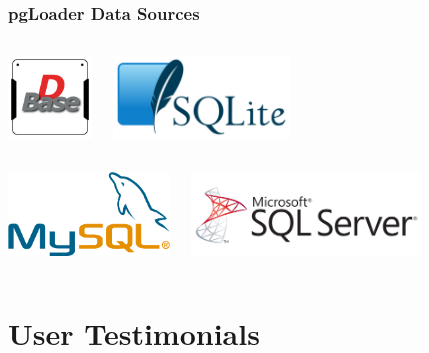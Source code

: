 \documentclass[xcolor=dvipsnames]{beamer}
\begin{document}
\begin{frame}[fragile]
  \frametitle{pgLoader Data Sources}

  \begin{columns}[c]
    \begin{center}
      \includegraphics[height=6em]{dBase.png}
    \end{center}
    \begin{center}
      \includegraphics[height=6em]{SQLite.png}
    \end{center}
  \end{columns}
  
  \begin{columns}[c]
    \begin{center}
      \includegraphics[height=6em]{mysql.png}
    \end{center}
    \begin{center}
      \includegraphics[height=6em]{mssql.png}
    \end{center}
  \end{columns}
\end{frame}

\section{User Testimonials}
\end{document}
